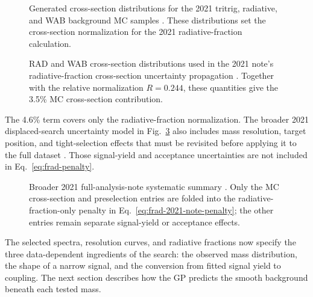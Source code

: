 \begin{figure}[H]
\centering
{}
\caption{Generated cross-section distributions for the 2021 tritrig, radiative, and
WAB background MC samples \cite{HPS2021FullAnalysisNote}. These distributions set the
cross-section normalization for the 2021 radiative-fraction calculation.}
\label{fig:2021-radfrac-xsec-note}
\end{figure}

\begin{figure}[H]
\centering
{}
\caption{RAD and WAB cross-section distributions used in the 2021 note's
radiative-fraction cross-section uncertainty propagation \cite{HPS2021FullAnalysisNote}.
Together with the relative normalization $R=0.244$, these quantities give the 3.5\%
MC cross-section contribution.}
\label{fig:2021-radfrac-xsec-syst-note}
\end{figure}

The 4.6\% term covers only the radiative-fraction normalization. The broader 2021
displaced-search uncertainty model in Fig.~\ref{fig:2021-syst-table-note} also includes
mass resolution, target position, and tight-selection effects that must be revisited
before applying it to the full dataset \cite[Sec.~9,
Table~58]{HPS2021FullAnalysisNote}. Those signal-yield and acceptance uncertainties are
not included in Eq.~\eqref{eq:frad-penalty}.

\begin{figure}[H]
\centering
{}
\caption{Broader 2021 full-analysis-note systematic summary
\cite{HPS2021FullAnalysisNote}. Only the MC cross-section and preselection entries
are folded into the radiative-fraction-only penalty in
Eq.~\eqref{eq:frad-2021-note-penalty}; the other entries remain separate signal-yield
or acceptance effects.}
\label{fig:2021-syst-table-note}
\end{figure}

The selected spectra, resolution curves, and radiative fractions now specify the three
data-dependent ingredients of the search: the observed mass distribution, the shape of
a narrow signal, and the conversion from fitted signal yield to coupling. The next
section describes how the GP predicts the smooth background beneath each tested mass.
